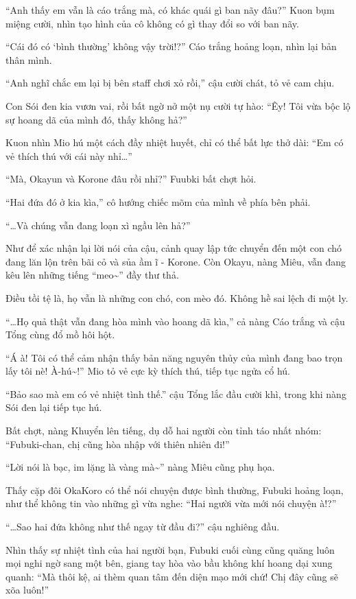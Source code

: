 \documentclass[../main.tex]{subfiles}
\begin{document}
``Anh thấy em vẫn là cáo trắng mà, có khác quái gì ban nãy đâu?'' Kuon bụm miệng cười, nhìn tạo hình của cô không có gì thay đổi so với ban nãy.

``Cái đó có `bình thường' không vậy trời!?'' Cáo trắng hoảng loạn, nhìn lại bản thân mình.

``Anh nghĩ chắc em lại bị bên staff chơi xỏ rồi,'' cậu cười chát, tỏ vẻ cam chịu.

Con Sói đen kia vươn vai, rồi bất ngờ nở một nụ cười tự hào: ``Êy! Tôi vừa bộc lộ sự hoang dã của mình đó, thấy không hả?''

Kuon nhìn Mio hú một cách đầy nhiệt huyết, chỉ có thể bất lực thở dài: ``Em có vẻ thích thú với cái này nhỉ\dots''

``Mà, Okayun và Korone đâu rồi nhỉ?'' Fuubki bất chợt hỏi.

``Hai đứa đó ở kia kìa,'' cô hướng chiếc mõm của mình về phía bên phải.

``\dots Và chúng vẫn đang loạn xì ngầu lên hả?''

Như để xác nhận lại lời nói của cậu, cảnh quay lập tức chuyển đến một con chó đang lăn lộn trên bãi cỏ và sủa ầm ĩ - Korone. Còn Okayu, nàng Miêu, vẫn đang kêu lên những tiếng ``meo\~{}'' đầy thư thả.

Điều tồi tệ là, họ vẫn là những con chó, con mèo đó. Không hề sai lệch đi một ly.

``\dots Họ quả thật vẫn đang hòa mình vào hoang dã kìa,'' cả nàng Cáo trắng và cậu Tổng cùng đổ mồ hôi hột.

``Á à! Tôi có thể cảm nhận thấy bản năng nguyên thủy của mình đang bao trọn lấy tôi nè! À-hú\~{}!'' Mio tỏ vẻ cực kỳ thích thú, tiếp tục ngửa cổ hú.

``Bảo sao mà em có vẻ nhiệt tình thế.'' cậu Tổng lắc đầu cười khì, trong khi nàng Sói đen lại tiếp tục hú.

Bất chợt, nàng Khuyển lên tiếng, dụ dỗ hai người còn tỉnh táo nhất nhóm: ``Fubuki-chan, chị cũng hòa nhập với thiên nhiên đi!''

``Lời nói là bạc, im lặng là vàng mà\~{}'' nàng Miêu cũng phụ họa.

Thấy cặp đôi OkaKoro có thể nói chuyện được bình thường, Fubuki hoảng loạn, như thể không tin vào những gì vừa nghe: ``Hai người vừa mới nói chuyện à!?''

``\dots Sao hai đứa không như thế ngay từ đầu đi?'' cậu nghiêng đầu.

Nhìn thấy sự nhiệt tình của hai người bạn, Fubuki cuối cùng cũng quăng luôn mọi nghi ngờ sang một bên, giang tay hòa vào bầu không khí hoang dại xung quanh: ``Mà thôi kệ, ai thèm quan tâm đến diện mạo mới chứ! Chị đây cũng sẽ xõa luôn!''
\end{document}
